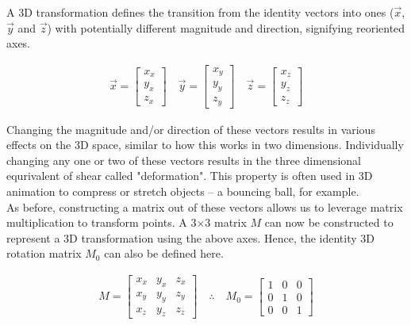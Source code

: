 \documentclass[12pt, a4paper]{article}
\begin{document}
A 3D transformation defines the transition from the identity vectors into ones
($\vec{x}$, $\vec{y}$ and $\vec{z}$) with potentially different magnitude and
direction, signifying reoriented axes.

\begin{align*}
    \vec{x} = \begin{bmatrix}
                  {x}_x \\ {y}_x \\ {z}_x
              \end{bmatrix}
    \quad
    \vec{y} = \begin{bmatrix}
                  {x}_y \\ {y}_y \\ {z}_y
              \end{bmatrix}
    \quad
    \vec{z} = \begin{bmatrix}
                  {x}_z \\ {y}_z \\ {z}_z
              \end{bmatrix}
\end{align*}

Changing the magnitude and/or direction of these vectors results in various effects
on the 3D space, similar to how this works in two dimensions. Individually
changing any one or two of these vectors results in the three dimensional
equrivalent of shear called "deformation". This property is often used in 3D
animation to compress or stretch objects -- a bouncing ball, for example. \\

As before, constructing a matrix out of these vectors allows us to leverage
matrix multiplication to transform points. A 3$\times$3 matrix $M$ can now be
constructed to represent a 3D transformation using the above axes. Hence, the
identity 3D rotation matrix $M_0$ can also be defined here.

\begin{align*}
    M = \begin{bmatrix}
            {x}_x & {y}_x & {z}_x \\
            {x}_y & {y}_y & {z}_y \\
            {x}_z & {y}_z & {z}_z
        \end{bmatrix} \quad\therefore\quad M_0 = \begin{bmatrix}
                                                     1 & 0 & 0 \\
                                                     0 & 1 & 0 \\
                                                     0 & 0 & 1
                                                 \end{bmatrix}
\end{align*}
\end{document}
